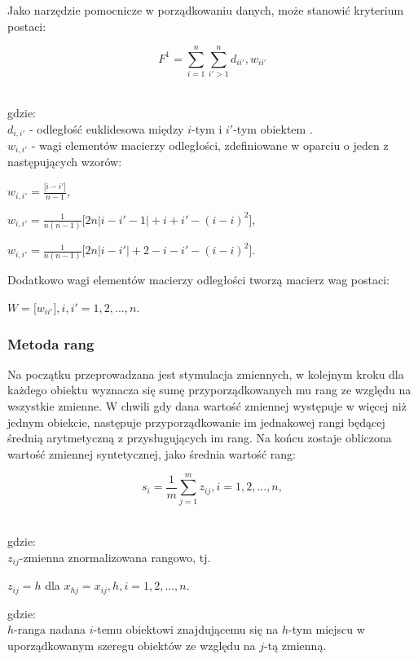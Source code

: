 \documentclass[12pt,a4paper]{report}
\begin{document}
Jako narzędzie pomocnicze w porządkowaniu danych, może stanowić kryterium postaci:

\begin{center}
$$F^1= \sum_{i=1}^{n} \sum_{i'>1}^{n} d_{ii'},w_{ii'}$$\\
\end{center}
gdzie:\\
 $d_{i,i'}$ - odległość euklidesowa między $i$-tym i $i'$-tym obiektem . \\
 $w_{i,i'}$ - wagi elementów macierzy odległości, zdefiniowane w oparciu o jeden z następujących wzorów: \\
 
 \begin{center}
 
 $ w_{i,i'}=\frac{| i-i' |}{n-1}$, $\qquad$ \\
   \end{center}
   \begin{center}
 $ w_{i,i'}=\frac{1}{n(n-1)}\lbrack{2n|i-i'-1|+i+i'-(i-i)^2\rbrack}$,\\
 \end{center}
 \begin{center}
 $ w_{i,i'}=\frac{1}{n(n-1)}\lbrack{2n|i-i'|+2-i-i'-(i-i)^2\rbrack}$.\\
\end{center}

Dodatkowo wagi elementów macierzy odległości tworzą macierz wag postaci:

\begin{center}
$W=\lbrack{w_{ii'}\rbrack}, i,i'=1, 2, ..., n.$
\end{center}


\subsubsection{Metoda rang}
\noindent


Na początku przeprowadzana jest stymulacja zmiennych, w kolejnym kroku dla każdego obiektu wyznacza się sumę przyporządkowanych mu rang ze względu na wszystkie zmienne. W chwili gdy dana wartość zmiennej występuje w więcej niż jednym obiekcie, następuje przyporządkowanie im jednakowej rangi będącej średnią arytmetyczną z przysługujących im rang. Na końcu zostaje obliczona wartość zmiennej syntetycznej, jako średnia wartość rang:\\
\begin{center}
$$s_{i}=\frac{1}{m}\sum_{j=1}^{m} z_{ij}, i=1, 2, ..., n,$$\\
\end{center}
gdzie:\\
$z_{ij}$-zmienna znormalizowana rangowo, tj.
\begin{center}
$z_{ij}=h$ dla $x_{hj}=x_{ij}, h,i=1, 2, ..., n.$
\end{center}
gdzie:\\
$h$-ranga nadana $i$-temu obiektowi znajdującemu się na $h$-tym miejscu w uporządkowanym szeregu obiektów ze względu na $j$-tą zmienną.
\end{document}
